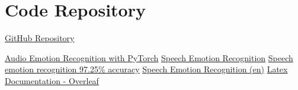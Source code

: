\documentclass[a4paper,12pt]{article}
\begin{document}
\section{Code Repository}
\href{https://github.com/IITJ-Projects/M23CSA545_PA1.git}{ GitHub Repository}
%
\begin{thebibliography}{9}
     \href{https://www.kaggle.com/code/swish9/audio-emotion-recognition-with-pytorch}{Audio Emotion Recognition with PyTorch}
     \href{https://www.kaggle.com/code/shivamburnwal/speech-emotion-recognition}{Speech Emotion Recognition}
     \href{https://www.kaggle.com/code/mostafaabdlhamed/speech-emotion-recognition-97-25-accuracy}{ Speech emotion recognition 97.25\% accuracy}
     \href{https://www.kaggle.com/datasets/dmitrybabko/speech-emotion-recognition-en}{ Speech Emotion Recognition (en)}
     \href{https://www.overleaf.com/}{ Latex Documentation - Overleaf}
\end{thebibliography}
\end{document}
